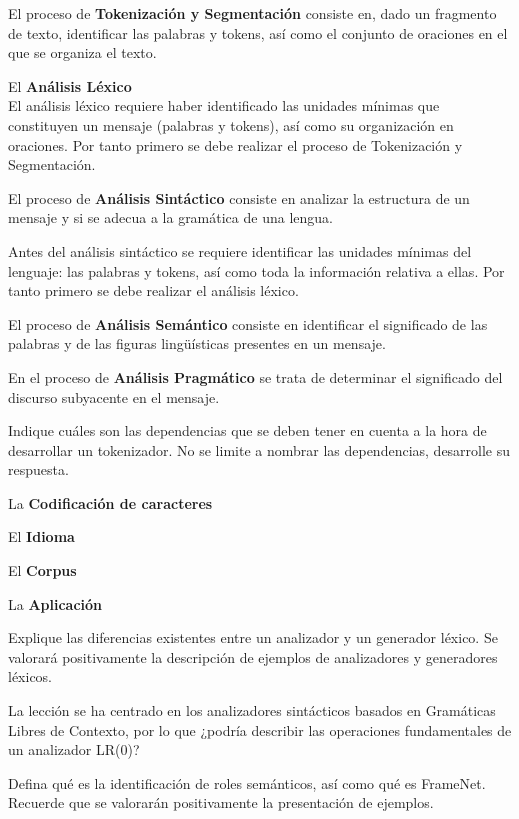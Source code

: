 \documentclass{exam}
\begin{document}
\begin{questions}
El proceso de {\bf Tokenización y Segmentación} consiste en, dado un fragmento de texto, identificar las palabras y tokens, así como el conjunto de oraciones en el que se organiza el texto.

El {\bf Análisis Léxico} \\
El análisis léxico requiere haber identificado las unidades mínimas que constituyen un mensaje (palabras y tokens), así como su organización en oraciones. Por tanto primero se debe realizar el proceso de Tokenización y Segmentación.

El proceso de {\bf Análisis Sintáctico} consiste en analizar la estructura de un mensaje y si se adecua a la gramática de una lengua.

Antes del análisis sintáctico se requiere identificar las unidades mínimas del lenguaje: las palabras y tokens, así como toda la información relativa a ellas. Por tanto primero se debe realizar el análisis léxico.

El proceso de {\bf Análisis Semántico} consiste en identificar el significado de las palabras y de las figuras lingüísticas presentes en un mensaje.

En el proceso de {\bf Análisis Pragmático} se trata de determinar el significado del discurso subyacente en el mensaje.

\question Indique cuáles son las dependencias que se deben tener en cuenta a la hora de desarrollar un tokenizador. No se limite a nombrar las dependencias, desarrolle su respuesta.

La {\bf Codificación de caracteres}

El {\bf Idioma}

El {\bf Corpus}

La {\bf Aplicación}

\question Explique las diferencias existentes entre un analizador y un generador léxico. Se valorará positivamente la descripción de ejemplos de analizadores y generadores léxicos. 

\question La lección se ha centrado en los analizadores sintácticos basados en Gramáticas Libres de Contexto, por lo que ¿podría describir las operaciones fundamentales de un analizador LR(0)?

\question Defina qué es la identificación de roles semánticos, así como qué es FrameNet. Recuerde que se valorarán positivamente la presentación de ejemplos.

\end{questions}
\end{document}
